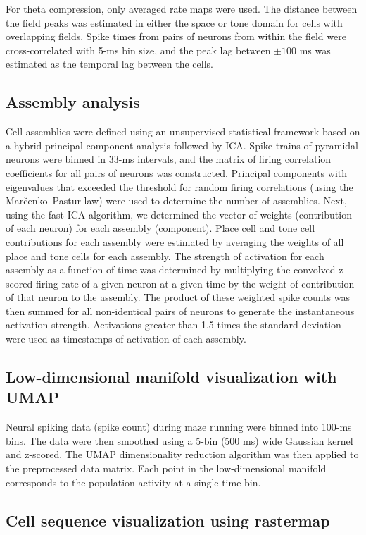 For theta compression, only averaged rate maps were used. The distance between the field peaks was estimated in either the space or tone domain for cells with overlapping fields. Spike times from pairs of neurons from within the field were cross-correlated with 5-ms bin size, and the peak lag between $\pm 100$ ms was estimated as the temporal lag between the cells.

\subsection{Assembly analysis}

Cell assemblies were defined using an unsupervised statistical framework based on a hybrid principal component analysis followed by ICA. Spike trains of pyramidal neurons were binned in 33-ms intervals, and the matrix of firing correlation coefficients for all pairs of neurons was constructed. Principal components with eigenvalues that exceeded the threshold for random firing correlations (using the Marčenko--Pastur law) were used to determine the number of assemblies. Next, using the fast-ICA algorithm, we determined the vector of weights (contribution of each neuron) for each assembly (component). Place cell and tone cell contributions for each assembly were estimated by averaging the weights of all place and tone cells for each assembly. The strength of activation for each assembly as a function of time was determined by multiplying the convolved z-scored firing rate of a given neuron at a given time by the weight of contribution of that neuron to the assembly. The product of these weighted spike counts was then summed for all non-identical pairs of neurons to generate the instantaneous activation strength. Activations greater than 1.5 times the standard deviation were used as timestamps of activation of each assembly.

\subsection{Low-dimensional manifold visualization with UMAP}

Neural spiking data (spike count) during maze running were binned into 100-ms bins. The data were then smoothed using a 5-bin (500 ms) wide Gaussian kernel and z-scored. The UMAP dimensionality reduction algorithm was then applied to the preprocessed data matrix. Each point in the low-dimensional manifold corresponds to the population activity at a single time bin.

\subsection{Cell sequence visualization using rastermap}


